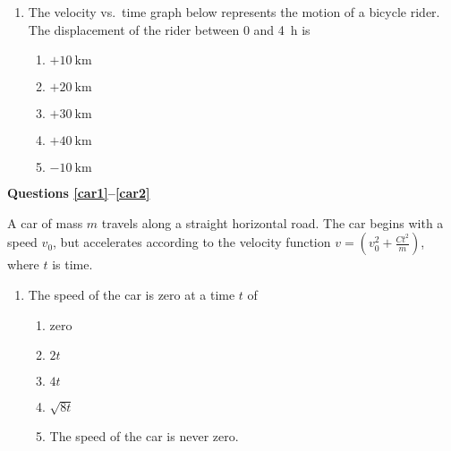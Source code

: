 \documentclass{../../../oss-classkick}
\begin{document}
\begin{multicols*}{2}
\begin{enumerate}[resume,leftmargin=18pt]
    \item The velocity vs.\ time graph below represents the motion of a bicycle
    rider. The displacement of the rider between $0$ and \SI{4}{\hour} is
    \begin{center}
    \end{center}
    \begin{enumerate}[nosep,leftmargin=18pt,label=(\Alph*)]
    \item $+\SI{10}{\kilo\metre}$
    \item $+\SI{20}{\kilo\metre}$
    \item $+\SI{30}{\kilo\metre}$
    \item $+\SI{40}{\kilo\metre}$
    \item $-\SI{10}{\kilo\metre}$
    \end{enumerate}
  \end{enumerate}
  
  \textbf{Questions \ref{car1}--\ref{car2}}

  A car of mass $m$ travels along a straight horizontal road. The car begins
  with a speed $v_0$, but accelerates according to the velocity function
  $\displaystyle v=\left(v_0^2+\frac{Ct^2}{m}\right)$, where $t$ is time.

  \begin{enumerate}[resume,leftmargin=18pt]
  \item The speed of the car is zero at a time $t$ of
    \begin{enumerate}[nosep,leftmargin=18pt,label=(\Alph*)]
    \item zero
    \item $2t$
    \item $4t$
    \item $\sqrt{8t}$
    \item The speed of the car is never zero.
    \end{enumerate}
    \label{car1}
    

\end{enumerate}
\end{multicols*}
\end{document}
